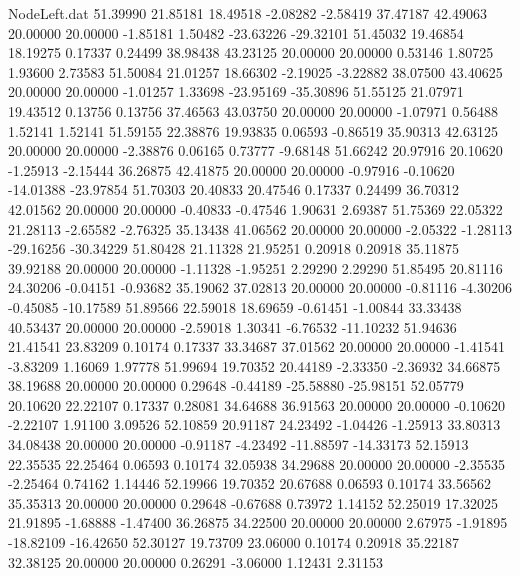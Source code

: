 \begin{filecontents}{NodeLeft.dat}
  51.39990   21.85181   18.49518    -2.08282   -2.58419   37.47187   42.49063   20.00000   20.00000   -1.85181    1.50482  -23.63226  -29.32101
  51.45032   19.46854   18.19275     0.17337    0.24499   38.98438   43.23125   20.00000   20.00000    0.53146    1.80725    1.93600    2.73583
  51.50084   21.01257   18.66302    -2.19025   -3.22882   38.07500   43.40625   20.00000   20.00000   -1.01257    1.33698  -23.95169  -35.30896
  51.55125   21.07971   19.43512     0.13756    0.13756   37.46563   43.03750   20.00000   20.00000   -1.07971    0.56488    1.52141    1.52141
  51.59155   22.38876   19.93835     0.06593   -0.86519   35.90313   42.63125   20.00000   20.00000   -2.38876    0.06165    0.73777   -9.68148
  51.66242   20.97916   20.10620    -1.25913   -2.15444   36.26875   42.41875   20.00000   20.00000   -0.97916   -0.10620  -14.01388  -23.97854
  51.70303   20.40833   20.47546     0.17337    0.24499   36.70312   42.01562   20.00000   20.00000   -0.40833   -0.47546    1.90631    2.69387
  51.75369   22.05322   21.28113    -2.65582   -2.76325   35.13438   41.06562   20.00000   20.00000   -2.05322   -1.28113  -29.16256  -30.34229
  51.80428   21.11328   21.95251     0.20918    0.20918   35.11875   39.92188   20.00000   20.00000   -1.11328   -1.95251    2.29290    2.29290
  51.85495   20.81116   24.30206    -0.04151   -0.93682   35.19062   37.02813   20.00000   20.00000   -0.81116   -4.30206   -0.45085  -10.17589
  51.89566   22.59018   18.69659    -0.61451   -1.00844   33.33438   40.53437   20.00000   20.00000   -2.59018    1.30341   -6.76532  -11.10232
  51.94636   21.41541   23.83209     0.10174    0.17337   33.34687   37.01562   20.00000   20.00000   -1.41541   -3.83209    1.16069    1.97778
  51.99694   19.70352   20.44189    -2.33350   -2.36932   34.66875   38.19688   20.00000   20.00000    0.29648   -0.44189  -25.58880  -25.98151
  52.05779   20.10620   22.22107     0.17337    0.28081   34.64688   36.91563   20.00000   20.00000   -0.10620   -2.22107    1.91100    3.09526
  52.10859   20.91187   24.23492    -1.04426   -1.25913   33.80313   34.08438   20.00000   20.00000   -0.91187   -4.23492  -11.88597  -14.33173
  52.15913   22.35535   22.25464     0.06593    0.10174   32.05938   34.29688   20.00000   20.00000   -2.35535   -2.25464    0.74162    1.14446
  52.19966   19.70352   20.67688     0.06593    0.10174   33.56562   35.35313   20.00000   20.00000    0.29648   -0.67688    0.73972    1.14152
  52.25019   17.32025   21.91895    -1.68888   -1.47400   36.26875   34.22500   20.00000   20.00000    2.67975   -1.91895  -18.82109  -16.42650
  52.30127   19.73709   23.06000     0.10174    0.20918   35.22187   32.38125   20.00000   20.00000    0.26291   -3.06000    1.12431    2.31153

\end{filecontents}
